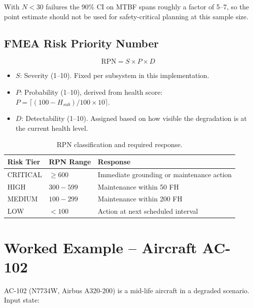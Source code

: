 \documentclass[11pt, a4paper]{report}
\begin{document}
With $N < 30$ failures the 90\% CI on MTBF spans roughly a factor of 5--7,
so the point estimate should not be used for safety-critical planning at
this sample size.

\section{FMEA Risk Priority Number}

\[
\text{RPN} = S \times P \times D
\]

\begin{itemize}
  \item $S$: Severity (1--10). Fixed per subsystem in this implementation.
  \item $P$: Probability (1--10), derived from health score:
        $P = \lceil (100 - H_{sub})/100 \times 10 \rceil$.
  \item $D$: Detectability (1--10). Assigned based on how visible the
        degradation is at the current health level.
\end{itemize}

\begin{table}[h!]
\centering
\begin{tabular}{@{}lll@{}}
\toprule
\textbf{Risk Tier} & \textbf{RPN Range} & \textbf{Response} \\
\midrule
CRITICAL & $\geq 600$  & Immediate grounding or maintenance action \\
HIGH     & $300 - 599$ & Maintenance within 50 FH \\
MEDIUM   & $100 - 299$ & Maintenance within 200 FH \\
LOW      & $< 100$     & Action at next scheduled interval \\
\bottomrule
\end{tabular}
\caption{RPN classification and required response.}
\end{table}

\chapter{Worked Example -- Aircraft AC-102}
\label{ch:worked}

AC-102 (N7734W, Airbus A320-200) is a mid-life aircraft in a degraded scenario.
Input state:
\end{document}
